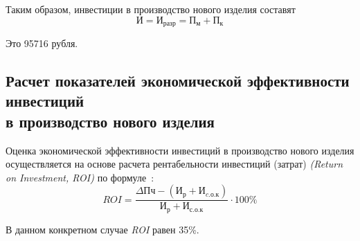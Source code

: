 Таким образом, инвестиции в производство нового изделия составят
\begin{equation}
  И = И_{разр}=П_м + П_к 
\end{equation}

Это 95716 рубля.

\subsection{Расчет показателей экономической эффективности инвестиций \\
  в производство нового изделия}
 Оценка экономической эффективности инвестиций в производство нового
изделия осуществляется на основе расчета рентабельности инвестиций
(затрат) \textit{(Return on Investment, ROI)} по формуле~\cite{bsuir-project-economics}:
\begin{equation}
  ROI= \frac{\Delta Пч - (И_р + И_{c.о.к})}{И_р + И_{с.о.к}} \cdot 100 \%
\end{equation}

В данном конкретном случае \textit{ROI} равен 35\%.

\newpage


